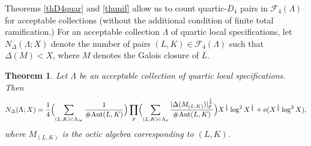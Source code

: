 \documentclass[10pt]{article}
\theoremstyle{plain}
\newtheorem{thm}{Theorem}[section]
\theoremstyle{definition}
\theoremstyle{remark}
\DeclareMathOperator{\Aut}{Aut}
\def\Aut{{\rm Aut}}
\def\FF{{\mathcal F}}
\begin{document}
Theorems \ref{thD4quar} and \ref{thunif} allow us to count
quartic-$D_4$ pairs in $\FF_4(\Lambda)$ for acceptable collections
(without the additional condition of finite total ramification.)  For
an acceptable collection $\Lambda$ of quartic local specifications,
let $N_\Delta(\Lambda;X)$ denote the number of pairs
$(L,K)\in\FF_4(\Lambda)$ such that $\Delta(M)<X$, where $M$ denotes
the Galois closure of $L$.
\begin{thm}\label{th:congQuartic}
Let $\Lambda$ be an acceptable collection of quartic local
specifications. Then
\begin{equation*}
N_\Delta(\Lambda;X)=\frac{1}{4}\Bigl(\sum_{(L,K)\in\Lambda_\infty}\frac{1}{\#\Aut(L,K)}\Bigr)
\prod_p\Bigl(\sum_{(L,K)\in\Lambda_p}\frac{|\Delta(M_{(L,K)})|_p^{\frac14}}{\#\Aut(L,K)}\Bigr)
X^{\frac14}\log^2 X^{\frac14}+o(X^{\frac14}\log^2 X),
\end{equation*}
where $M_{(L,K)}$ is the octic algebra corresponding to $(L,K)$.
\end{thm}
\end{document}
